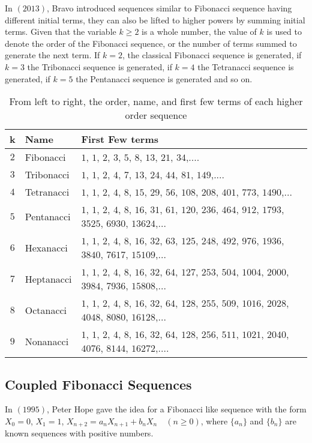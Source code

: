 \begin{large}
\noindent In $(2013)$, Bravo\cite{bravo} introduced sequences similar to  Fibonacci sequence having different initial terms, they can also be lifted to higher powers by summing initial terms. Given that the variable $k \geq 2$ is a whole number, the value of $k$ is used to denote the order of the Fibonacci sequence, or the number of terms summed to generate the next term. If $k=2$, the classical Fibonacci sequence is generated, if $k=3$ the Tribonacci sequence is generated, if $k=4$ the Tetranacci sequence is generated, if $k=5$ the Pentanacci sequence is generated  and so on.
\begin{table}[H]
\begin{center}
\begin{tabular}{|c|l|l|}
\hline 
\textbf{k} &\textbf{ Name} & \textbf{First Few terms }\\ 
\hline 
$2 $& Fibonacci & $1$, $1$, $2$, $3$, $5$, $8$, $13$, $21$, $34$,.... \\ 
\hline 
$3 $& Tribonacci &  $1$, $1$, $2$, $4$, $7$, $13$, $24$, $44$, $81$, $149$,.... \\ 
\hline 
$4 $& Tetranacci & $1$, $1$, $2$, $4$, $8$, $15$, $29$, $56$, $108$, $208$, $401$, $773$, $1490$,... \\ 
\hline 
$5 $& Pentanacci &  $1$, $1$, $2$, $4$, $8$, $16$, $31$, $61$, $120$, $236$, $464$, $912$, $1793$, $3525$, $6930$, $13624$,... \\ 
\hline 
$6 $& Hexanacci & $1$, $1$, $2$, $4$, $8$, $16$, $32$, $63$, $125$, $248$, $492$, $976$, $1936$, $3840$, $7617$, $15109$,... \\ 
\hline 
$7 $& Heptanacci & $1$, $1$, $2$, $4$, $8$, $16$, $32$, $64$, $127$, $253$, $504$, $1004$, $2000$, $3984$, $7936$, $15808$,...\\ 
\hline 
$8 $& Octanacci & $1$, $1$, $2$, $4$, $8$, $16$, $32$, $64$, $128$, $255$, $509$, $1016$, $2028$, $4048$, $8080$, $16128$,...\\ 
\hline 
$9 $& Nonanacci &  $1$, $1$, $2$, $4$, $8$, $16$, $32$, $64$, $128$, $256$, $511$, $1021$, $2040$, $4076$, $8144$, $16272$,.... \\ 
\hline 
\end{tabular}
\vspace{1mm}
\caption{From left to right, the order, name, and first few terms of each higher order sequence}
\label{Tab2}
\end{center}
\end{table} 
\subsection*{Coupled Fibonacci Sequences}
\noindent In $(1995)$, Peter Hope\cite{hope} gave the idea for a Fibonacci like sequence with the form $X_0 = 0$, $X_1 = 1$, $X_{n+2} = a_{n}X_{n+1}+b_{n}X_{n} \quad(n\geq 0)$, where $\lbrace a_n\rbrace $ and $\lbrace b_n\rbrace $ are known sequences with positive numbers. 


\end{large}
